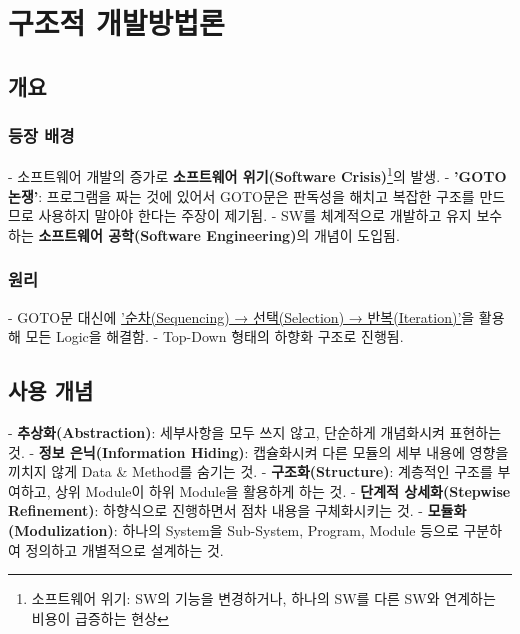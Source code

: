 \documentclass[a4paper,12pt]{article}
\begin{document}
\title{}
\author{}
\date{}
\maketitle
\newpage
\tableofcontents
\newpage

\section{구조적 개발방법론}

\subsection{개요}
\subsubsection{등장 배경}
- 소프트웨어 개발의 증가로 \textbf{소프트웨어 위기(Software Crisis)}\footnote{소프트웨어 위기: SW의 기능을 변경하거나, 하나의 SW를 다른 SW와 연계하는 비용이 급증하는 현상}의 발생.
\newline
- \textbf{'GOTO 논쟁'}: 프로그램을 짜는 것에 있어서 GOTO문은 판독성을 해치고 복잡한 구조를 만드므로 사용하지 말아야 한다는 주장이 제기됨.
\newline
- SW를 체계적으로 개발하고 유지 보수하는 \textbf{소프트웨어 공학(Software Engineering)}의 개념이 도입됨.

\subsubsection{원리}
- GOTO문 대신에 \underline{'순차(Sequencing) → 선택(Selection) → 반복(Iteration)'}을 활용해 모든 Logic을 해결함.
\newline
- Top-Down 형태의 하향화 구조로 진행됨.
\newline

\subsection{사용 개념}
- \textbf{추상화(Abstraction)}: 세부사항을 모두 쓰지 않고, 단순하게 개념화시켜 표현하는 것.
\newline
- \textbf{정보 은닉(Information Hiding)}: 캡슐화시켜 다른 모듈의 세부 내용에 영향을 끼치지 않게 Data \& Method를 숨기는 것.
\newline
- \textbf{구조화(Structure)}: 계층적인 구조를 부여하고, 상위 Module이 하위 Module을 활용하게 하는 것.
\newline
- \textbf{단계적 상세화(Stepwise Refinement)}: 하향식으로 진행하면서 점차 내용을 구체화시키는 것.
\newline
- \textbf{모듈화(Modulization)}: 하나의 System을 Sub-System, Program, Module 등으로 구분하여 정의하고 개별적으로 설계하는 것.
\newline
\end{document}
